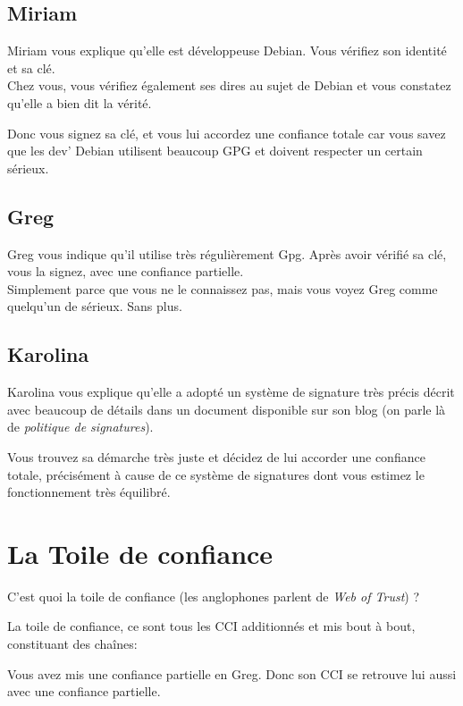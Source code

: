 \subsection{Miriam}\label{miriam}

Miriam vous explique qu'elle est développeuse Debian. Vous vérifiez son
identité et sa clé.\\Chez vous, vous vérifiez également ses dires au
sujet de Debian et vous constatez qu'elle a bien dit la vérité.

Donc vous signez sa clé, et vous lui accordez une confiance totale car
vous savez que les dev' Debian utilisent beaucoup GPG et doivent
respecter un certain sérieux.

\subsection{Greg}\label{greg}

Greg vous indique qu'il utilise très régulièrement Gpg. Après avoir
vérifié sa clé, vous la signez, avec une confiance
partielle.\\Simplement parce que vous ne le connaissez pas, mais vous
voyez Greg comme quelqu'un de sérieux. Sans plus.

\subsection{Karolina}\label{karolina}

Karolina vous explique qu'elle a adopté un système de signature très
précis décrit avec beaucoup de détails dans un document disponible sur
son blog (on parle là de \emph{politique de signatures}).

Vous trouvez sa démarche très juste et décidez de lui accorder une
confiance totale, précisément à cause de ce système de signatures dont
vous estimez le fonctionnement très équilibré.

\section{La Toile de confiance}\label{la-toile-de-confiance}

C'est quoi la toile de confiance (les anglophones parlent de \emph{Web
of Trust}) ?

La toile de confiance, ce sont tous les CCI additionnés et mis bout à
bout, constituant des chaînes:

Vous avez mis une confiance partielle en Greg. Donc son CCI se retrouve
lui aussi avec une confiance partielle.

